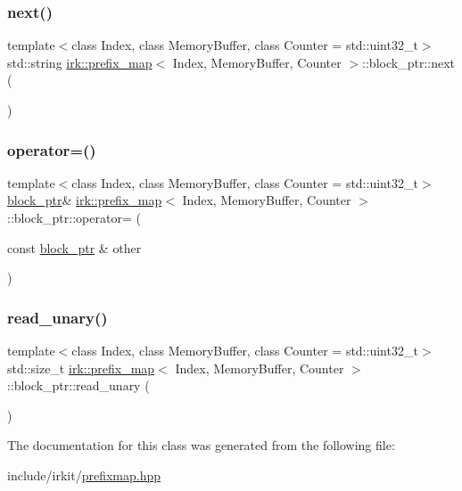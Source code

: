 \subsubsection{\texorpdfstring{next()}{next()}}
{\footnotesize\ttfamily template$<$class Index, class Memory\+Buffer, class Counter = std\+::uint32\+\_\+t$>$ \\
std\+::string \mbox{\hyperlink{classirk_1_1prefix__map}{irk\+::prefix\+\_\+map}}$<$ Index, Memory\+Buffer, Counter $>$\+::block\+\_\+ptr\+::next (\begin{DoxyParamCaption}{ }\end{DoxyParamCaption})\hspace{0.3cm}{\ttfamily [inline]}}

\mbox{\label{classirk_1_1prefix__map_1_1block__ptr_a095e7ba450fb5a91e4a9d18d999c8b8b}} 
\subsubsection{\texorpdfstring{operator=()}{operator=()}}
{\footnotesize\ttfamily template$<$class Index, class Memory\+Buffer, class Counter = std\+::uint32\+\_\+t$>$ \\
\mbox{\hyperlink{classirk_1_1prefix__map_1_1block__ptr}{block\+\_\+ptr}}\& \mbox{\hyperlink{classirk_1_1prefix__map}{irk\+::prefix\+\_\+map}}$<$ Index, Memory\+Buffer, Counter $>$\+::block\+\_\+ptr\+::operator= (\begin{DoxyParamCaption}\item[{const \mbox{\hyperlink{classirk_1_1prefix__map_1_1block__ptr}{block\+\_\+ptr}} \&}]{other }\end{DoxyParamCaption})\hspace{0.3cm}{\ttfamily [default]}}

\mbox{\label{classirk_1_1prefix__map_1_1block__ptr_afe1fc5491585abf3d5e03174fc9399b9}} 
\subsubsection{\texorpdfstring{read\+\_\+unary()}{read\_unary()}}
{\footnotesize\ttfamily template$<$class Index, class Memory\+Buffer, class Counter = std\+::uint32\+\_\+t$>$ \\
std\+::size\+\_\+t \mbox{\hyperlink{classirk_1_1prefix__map}{irk\+::prefix\+\_\+map}}$<$ Index, Memory\+Buffer, Counter $>$\+::block\+\_\+ptr\+::read\+\_\+unary (\begin{DoxyParamCaption}{ }\end{DoxyParamCaption})\hspace{0.3cm}{\ttfamily [inline]}}



The documentation for this class was generated from the following file\+:\begin{DoxyCompactItemize}
\item 
include/irkit/\mbox{\hyperlink{prefixmap_8hpp}{prefixmap.\+hpp}}\end{DoxyCompactItemize}
